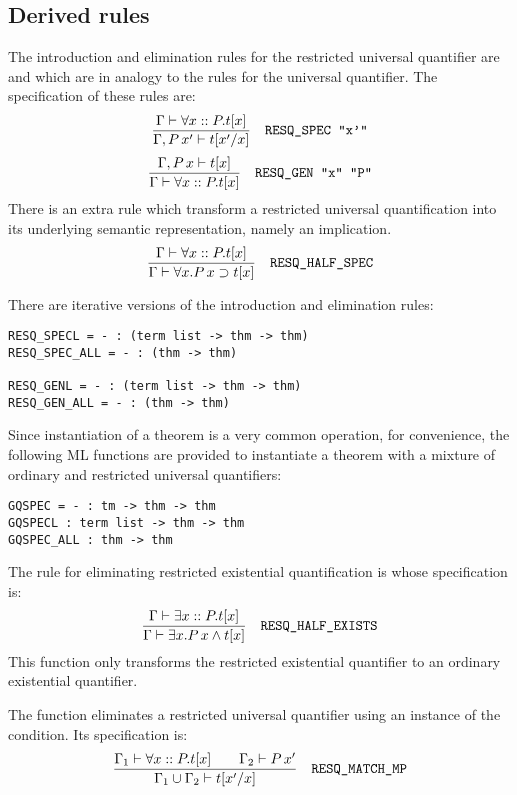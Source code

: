 \subsection{Derived rules}

The introduction and elimination rules for the restricted universal
quantifier are  and  which are in analogy
to the rules for the universal quantifier. The specification of these
rules are:
\[
\frac{\Gamma \THM \forall x :: P. t[x]}{\Gamma,P\,x'\THM t[x'/x]}
\quad\mbox{{\tt RESQ\_SPEC "x'"}}
\]
\[
\frac{\Gamma,P\,x\THM t[x]}{\Gamma \THM \forall x :: P. t[x]}
\quad\mbox{{\tt RESQ\_GEN "x" "P"}}
\]
There is an extra rule  which transform a
restricted universal quantification into its underlying semantic
representation, namely an implication.
\[
\frac{\Gamma \THM \forall x :: P. t[x]}{\Gamma \THM\forall x. P\,x\IMP t[x]}
\quad\mbox{{\tt RESQ\_HALF\_SPEC}}
\]

There are iterative versions of the introduction and elimination rules:
\begin{boxed}
\begin{verbatim}
RESQ_SPECL = - : (term list -> thm -> thm)
RESQ_SPEC_ALL = - : (thm -> thm)

RESQ_GENL = - : (term list -> thm -> thm)
RESQ_GEN_ALL = - : (thm -> thm)
\end{verbatim}
\end{boxed}

Since instantiation of a theorem is a very common operation, for
convenience, the following ML functions are provided to instantiate a
theorem with a mixture of ordinary and restricted universal quantifiers:
\begin{boxed}
\begin{verbatim}
GQSPEC = - : tm -> thm -> thm
GQSPECL : term list -> thm -> thm
GQSPEC_ALL : thm -> thm
\end{verbatim}
\end{boxed}

The rule for eliminating restricted existential quantification is
 whose specification is:
\[
\frac{\Gamma \THM \exists x:: P. t[x]}{\Gamma \THM \exists x. P\,x
\AND t[x]}\quad\mbox{{\tt RESQ\_HALF\_EXISTS}}
\]
This function only transforms the restricted existential quantifier to
an ordinary existential quantifier.

The function  eliminates a restricted universal
quantifier using an instance of the condition. Its specification is:
\[
\frac{\Gamma_1 \THM \forall x::P. t[x]\qquad\Gamma_2\THM P\,x'}
{\Gamma_1 \cup \Gamma_2 \THM t[x'/x]}\quad\mbox{{\tt RESQ\_MATCH\_MP}}
\]

